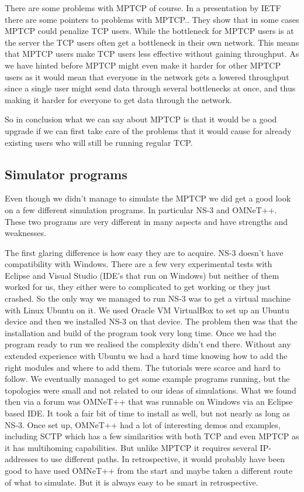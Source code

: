 \documentclass[11pt,twocolumn]{article}
\begin{document}
There are some problems with MPTCP of course. In a presentation by IETF there are some pointers to problems with MPTCP.\cite{IETF-Probs}. They show that in some cases MPTCP could penalize TCP users. While the bottleneck for MPTCP users is at the server the TCP users often get a bottleneck in their own network. This means that MPTCP users make TCP users less effective without gaining throughput. As we have hinted before MPTCP might even make it harder for other MPTCP users as it would mean that everyone in the network gets a lowered throughput since a single user might send data through several bottlenecks at once, and thus making it harder for everyone to get data through the network.

So in conclusion what we can say about MPTCP is that it would be a good upgrade if we can first take care of the problems that it would cause for already existing users who will still be running regular TCP.


\subsection{Simulator programs}

Even though we didn't manage to simulate the MPTCP we did get a good look on a few different simulation programs. In particular NS-3 and OMNeT++. These two programs are very different in many aspects and have strengths and weaknesses.

The first glaring difference is how easy they are to acquire. NS-3 doesn't have compatibility with Windows. There are a few very experimental tests with Eclipse and Visual Studio (IDE's that run on Windows) but neither of them worked for us, they either were to complicated to get working or they just crashed. So the only way we managed to run NS-3 was to get a virtual machine with Linux Ubuntu on it. We used Oracle VM VirtualBox to set up an Ubuntu device and then we installed NS-3 on that device. The problem then was that the installation and build of the program took very long time. Once we had the program ready to run we realised the complexity didn't end there. Without any extended experience with Ubuntu we had a hard time knowing how to add the right modules and where to add them. The tutorials were scarce and hard to follow. We eventually managed to get some example programs running, but the topologies were small and not related to our ideas of simulations. What we found then via a forum was OMNeT++ that was runnable on Windows via an Eclipse based IDE. It took a fair bit of time to install as well, but not nearly as long as NS-3. Once set up, OMNeT++ had a lot of interesting demos and examples, including SCTP which has a few similarities with both TCP and even MPTCP as it has multihoming capabilities. But unlike MPTCP it requires several IP-addresses to use different paths. In retrospective, it would probably have been good to have used OMNeT++ from the start and maybe taken a different route of what to simulate. But it is always easy to be smart in retrospective.
\end{document}
